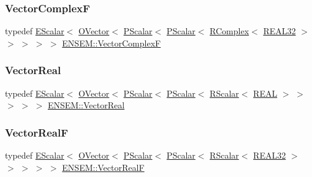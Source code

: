 \mbox{\label{group__defs_ga6a0a527d27235e5a8e8f28342eb7676f}} 
\subsubsection{\texorpdfstring{VectorComplexF}{VectorComplexF}}
{\footnotesize\ttfamily typedef \mbox{\hyperlink{classENSEM_1_1EScalar}{E\+Scalar}}$<$ \mbox{\hyperlink{classENSEM_1_1OVector}{O\+Vector}}$<$ \mbox{\hyperlink{classENSEM_1_1PScalar}{P\+Scalar}}$<$ \mbox{\hyperlink{classENSEM_1_1PScalar}{P\+Scalar}}$<$ \mbox{\hyperlink{classENSEM_1_1RComplex}{R\+Complex}}$<$ \mbox{\hyperlink{namespaceENSEM_a7540d01191172323e9073283d772576d}{R\+E\+A\+L32}} $>$ $>$ $>$ $>$ $>$ \mbox{\hyperlink{group__defs_ga6a0a527d27235e5a8e8f28342eb7676f}{E\+N\+S\+E\+M\+::\+Vector\+ComplexF}}}

\mbox{\label{group__defs_ga3ccd78d00f8c76c389577cc0dbe460fc}} 
\subsubsection{\texorpdfstring{VectorReal}{VectorReal}}
{\footnotesize\ttfamily typedef \mbox{\hyperlink{classENSEM_1_1EScalar}{E\+Scalar}}$<$ \mbox{\hyperlink{classENSEM_1_1OVector}{O\+Vector}}$<$ \mbox{\hyperlink{classENSEM_1_1PScalar}{P\+Scalar}}$<$ \mbox{\hyperlink{classENSEM_1_1PScalar}{P\+Scalar}}$<$ \mbox{\hyperlink{classENSEM_1_1RScalar}{R\+Scalar}}$<$ \mbox{\hyperlink{namespaceENSEM_a6dd9aa6508168f545c861787e63ddd1e}{R\+E\+AL}} $>$ $>$ $>$ $>$ $>$ \mbox{\hyperlink{group__defs_ga3ccd78d00f8c76c389577cc0dbe460fc}{E\+N\+S\+E\+M\+::\+Vector\+Real}}}

\mbox{\label{group__defs_gaa81b1a62c5846ad0db2fe60ff8f1e1b3}} 
\subsubsection{\texorpdfstring{VectorRealF}{VectorRealF}}
{\footnotesize\ttfamily typedef \mbox{\hyperlink{classENSEM_1_1EScalar}{E\+Scalar}}$<$ \mbox{\hyperlink{classENSEM_1_1OVector}{O\+Vector}}$<$ \mbox{\hyperlink{classENSEM_1_1PScalar}{P\+Scalar}}$<$ \mbox{\hyperlink{classENSEM_1_1PScalar}{P\+Scalar}}$<$ \mbox{\hyperlink{classENSEM_1_1RScalar}{R\+Scalar}}$<$ \mbox{\hyperlink{namespaceENSEM_a7540d01191172323e9073283d772576d}{R\+E\+A\+L32}} $>$ $>$ $>$ $>$ $>$ \mbox{\hyperlink{group__defs_gaa81b1a62c5846ad0db2fe60ff8f1e1b3}{E\+N\+S\+E\+M\+::\+Vector\+RealF}}}

